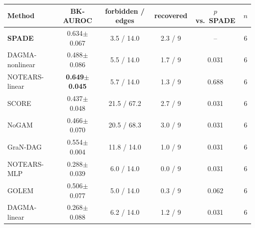 \begin{tabular}{lccccc}
\toprule
Method & BK-AUROC & forbidden / edges & recovered & $p$ vs.\ SPADE & $n$ \\ \midrule
\textbf{SPADE} & 0.634$\pm$0.067 & 3.5 / 14.0 & 2.3 / 9 & -- & 6 \\
DAGMA-nonlinear & 0.488$\pm$0.086 & 5.5 / 14.0 & 1.7 / 9 & 0.031 & 6 \\
NOTEARS-linear & \textbf{0.649$\pm$0.045} & 5.7 / 14.0 & 1.3 / 9 & 0.688 & 6 \\
SCORE & 0.437$\pm$0.048 & 21.5 / 67.2 & 2.7 / 9 & 0.031 & 6 \\
NoGAM & 0.466$\pm$0.070 & 20.5 / 68.3 & 3.0 / 9 & 0.031 & 6 \\
GraN-DAG & 0.554$\pm$0.004 & 11.8 / 14.0 & 1.0 / 9 & 0.031 & 6 \\
NOTEARS-MLP & 0.288$\pm$0.039 & 6.0 / 14.0 & 0.0 / 9 & 0.031 & 6 \\
GOLEM & 0.506$\pm$0.077 & 5.0 / 14.0 & 0.3 / 9 & 0.062 & 6 \\
DAGMA-linear & 0.268$\pm$0.088 & 6.2 / 14.0 & 1.2 / 9 & 0.031 & 6 \\
\bottomrule
\end{tabular}
